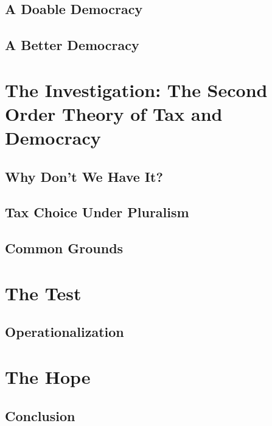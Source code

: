 \documentclass[11pt,a4paper,openright,oneside,titlepage]{book}
\begin{document}
	\chapter[Doable Democracy]{A Doable Democracy}
		\label{chap:doable-democracy}
		
	\chapter[Better Democracy]{A Better Democracy}
		\label{chap:better-democracy}
		
\part[The Investigation]{The Investigation: The Second Order Theory of Tax and Democracy}
	\label{part:tax-democracy}
	\chapter[Why Not?]{Why Don't We Have It?}
		\label{chap:no-better-tax}
		
	\chapter[Tax Choice Under Pluralism]{Tax Choice Under Pluralism}
		\label{chap:tax-under-pluralism}
		
	\chapter{Common Grounds}
		\label{chap:common-grounds}
		
\part{The Test}
	\label{part:test}
	\chapter{Operationalization}
		\label{chap:operationalization}
		
\part{The Hope}
	\label{part:hope}
	\chapter{Conclusion}
		\label{chap:conclusion-phd}
		
\backmatter
	\glsaddall
	\printglossaries
	
\end{document}
